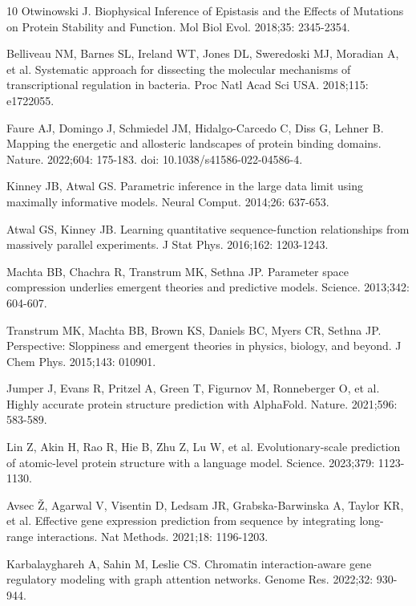 \documentclass[10pt,letterpaper]{article}
\begin{document}
\begin{thebibliography}{10}
 Otwinowski J. Biophysical Inference of Epistasis and the Effects of Mutations on Protein Stability and Function. Mol Biol Evol. 2018;35: 2345-2354.

 Belliveau NM, Barnes SL, Ireland WT, Jones DL, Sweredoski MJ, Moradian A, et al. Systematic approach for dissecting the molecular mechanisms of transcriptional regulation in bacteria. Proc Natl Acad Sci USA. 2018;115: e1722055. 

 Faure AJ, Domingo J, Schmiedel JM, Hidalgo-Carcedo C, Diss G, Lehner B. Mapping the energetic and allosteric landscapes of protein binding domains. Nature. 2022;604: 175-183. doi: 10.1038/s41586-022-04586-4.

 Kinney JB, Atwal GS. Parametric inference in the large data limit using maximally informative models. Neural Comput. 2014;26: 637-653. 

 Atwal GS, Kinney JB. Learning quantitative sequence-function relationships from massively parallel experiments. J Stat Phys. 2016;162: 1203-1243. 

 Machta BB, Chachra R, Transtrum MK, Sethna JP. Parameter space compression underlies emergent theories and predictive models. Science. 2013;342: 604-607. 

 Transtrum MK, Machta BB, Brown KS, Daniels BC, Myers CR, Sethna JP. Perspective: Sloppiness and emergent theories in physics, biology, and beyond. J Chem Phys. 2015;143: 010901. 

 Jumper J, Evans R, Pritzel A, Green T, Figurnov M, Ronneberger O, et al. Highly accurate protein structure prediction with AlphaFold. Nature. 2021;596: 583-589.

 Lin Z, Akin H, Rao R, Hie B, Zhu Z, Lu W, et al. Evolutionary-scale prediction of atomic-level protein structure with a language model. Science. 2023;379: 1123-1130.

 Avsec {\v{Z}}, Agarwal V, Visentin D, Ledsam JR, Grabska-Barwinska A, Taylor KR, et al. Effective gene expression prediction from sequence by integrating long-range interactions. Nat Methods. 2021;18: 1196-1203.

 Karbalayghareh A, Sahin M, Leslie CS. Chromatin interaction-aware gene regulatory modeling with graph attention networks. Genome Res. 2022;32: 930-944.


\end{thebibliography}
\end{document}
